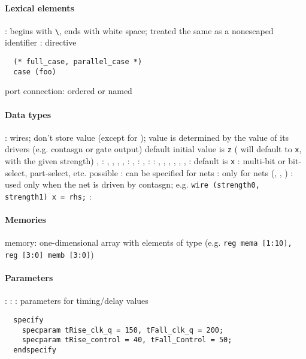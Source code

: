 \documentclass{memo}
\begin{document}
\small


\paragraph{Lexical elements}
\bit
\w {}: begins with \verb+\+, ends with white space;
treated the same as a nonescaped identifier
\w {}:  directive
  \begin{verbatim}
  (* full_case, parallel_case *)
  case (foo)
  \end{verbatim}
\w port connection: ordered or named
\eit

\paragraph{Data types}
\bit
\w {}: wires; don't store value (except for ); 
   \bit
   \w value is determined by the value of its drivers (e.g. contasgn or gate
   output)
   \w default initial value is \verb+z+ ( will default to \verb+x+,
   with the given strength)
   \w {}, :
   \w {}, , , , :
   \w {}, :
   \w {}, :
   \eit
\w {}: , , , , 
   \bit
   \w {}, , : default is \verb+x+
   \eit
\w {}: multi-bit  or 
   \bit
   \w bit-select, part-select, etc. possible
   \eit
\w {}: can be specified for nets
   \bit
   \w {}: only for  nets (,
   , )
   \w {}: used only when the net is driven by contasgn;
     e.g. \verb+wire (strength0, strength1) x = rhs;+
   \eit
\w {}:
\eit

\paragraph{Memories}
\bit
\w memory: one-dimensional array with elements of type 
   (e.g. \verb+reg mema [1:10], reg [3:0] memb [3:0]+)
\eit

\paragraph{Parameters}
\bit
\w {}:
\w {}:
\w {}: parameters for timing/delay values
  {\scriptsize
  \begin{verbatim}
  specify
    specparam tRise_clk_q = 150, tFall_clk_q = 200;
    specparam tRise_control = 40, tFall_Control = 50;
  endspecify
  \end{verbatim}}
\eit
\end{document}
